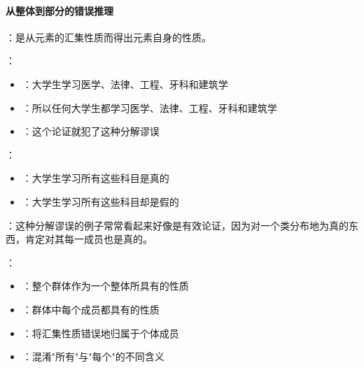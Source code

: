 \paragraph{从整体到部分的错误推理}
\begin{examplebox}[title=从整体到部分的错误推理]
：是从元素的汇集性质而得出元素自身的性质。

：
\begin{itemize}
  \item {}：大学生学习医学、法律、工程、牙科和建筑学
  \item {}：所以任何大学生都学习医学、法律、工程、牙科和建筑学
  \item {}：这个论证就犯了这种分解谬误
\end{itemize}

：
\begin{itemize}
  \item {}：大学生学习所有这些科目是真的
  \item {}：大学生学习所有这些科目却是假的
\end{itemize}

：这种分解谬误的例子常常看起来好像是有效论证，因为对一个类分布地为真的东西，肯定对其每一成员也是真的。

：
\begin{itemize}
  \item {}：整个群体作为一个整体所具有的性质
  \item {}：群体中每个成员都具有的性质
  \item {}：将汇集性质错误地归属于个体成员
  \item {}：混淆"所有"与"每个"的不同含义
\end{itemize}
\end{examplebox}

